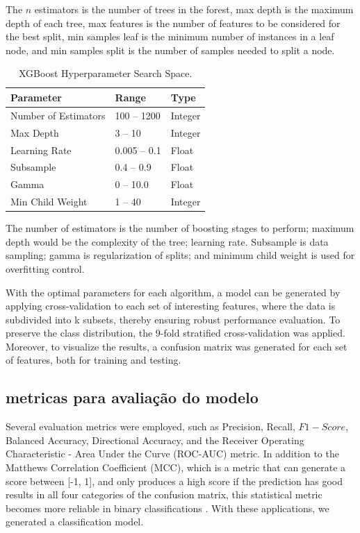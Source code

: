 \documentclass{ieeeaccess}
\begin{document}
The $n$ estimators is the number of trees in the forest, max depth is the maximum depth of each tree, max features is the number of features to be considered for the best split, min samples leaf is the minimum number of instances in a leaf node, and min samples split is the number of samples needed to split a node.

\begin{table}
\caption{XGBoost Hyperparameter Search Space.}
\label{tab:xgb_params}
\setlength{\tabcolsep}{3pt}
\begin{tabular}{|p{95pt}|p{65pt}|p{60pt}|}
\hline
Parameter & Range & Type \\
\hline
Number of Estimators & 100 -- 1200 & Integer \\
Max Depth & 3 -- 10 & Integer \\
Learning Rate & 0.005 -- 0.1 & Float \\
Subsample & 0.4 -- 0.9 & Float \\
Gamma & 0 -- 10.0 & Float \\
Min Child Weight & 1 -- 40 & Integer \\
\hline
\end{tabular}
\end{table}

The number of estimators is the number of boosting stages to perform; maximum depth would be the complexity of the tree; learning rate. Subsample is data sampling; gamma is regularization of splits; and minimum child weight is used for overfitting control.

With the optimal parameters for each algorithm, a model can be generated by applying cross-validation to each set of interesting features, where the data is subdivided into k subsets, thereby ensuring robust performance evaluation.
To preserve the class distribution, the 9-fold stratified cross-validation was applied. Moreover, to visualize the results, a confusion matrix was generated for each set of features, both for training and testing. 

\subsection{metricas para avaliação do modelo}

Several evaluation metrics were employed, such as Precision, Recall, $F1-Score$, Balanced Accuracy, Directional Accuracy, and the Receiver Operating Characteristic - Area Under the Curve (ROC-AUC) metric. In addition to the Matthews Correlation Coefficient (MCC), which is a metric that can generate a score between [-1, 1], and only produces a high score if the prediction has good results in all four categories of the confusion matrix, this statistical metric becomes more reliable in binary classifications \cite{chicco2020advantages}. With these applications, we generated a classification model.
\end{document}

